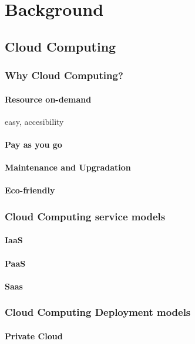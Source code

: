 \documentclass[12pt,a4paper]{report}
\begin{document}
\chapter{Background}

\section{Cloud Computing}

\subsection{Why Cloud Computing?}
\subsubsection{Resource on-demand}
easy, accesibility
\subsubsection{Pay as you go}
\subsubsection{Maintenance and Upgradation}
\subsubsection{Eco-friendly}

\subsection{Cloud Computing service models}
\subsubsection{IaaS}
\subsubsection{PaaS}
\subsubsection{Saas}

\subsection{Cloud Computing Deployment models}
\subsubsection{Private Cloud}
\end{document}
